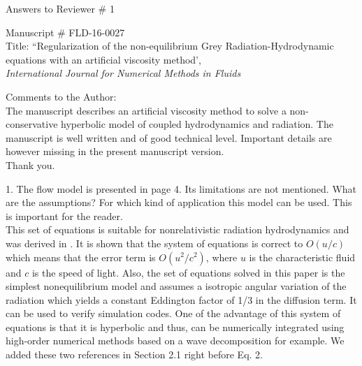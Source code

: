 \documentclass{article}
\begin{document}
\begin{center}
{ \Large Answers to Reviewer \# 1}
\end{center}

\bigskip

\noindent Manuscript \# FLD-16-0027 \\
Title: ``Regularization of the non-equilibrium Grey Radiation-Hydrodynamic equations with an artificial viscosity method', \\
{\it International Journal for Numerical Methods in Fluids}\\

\bigskip
\bigskip

{\color{blue}
Comments to the Author: \\ 
The manuscript describes an artificial viscosity method to solve a non-conservative hyperbolic model of coupled hydrodynamics and radiation. The manuscript is well written and of good technical level.
Important details are however missing in the present manuscript version.\\}
Thank you.
\bigskip

{\color{blue}
1. The flow model is presented in page 4. Its limitations are not mentioned. What are the assumptions? For which kind of application this model can be used. This is important for the reader. \\}
This set of equations is suitable for nonrelativistic radiation hydrodynamics and was derived in \cite{LowrieMorelHittinger, LowrieMorel}. It is shown that the system of equations is correct to $O(u/c)$ which means that the error term is $O(u^2/c^2)$, where $u$ is the characteristic fluid and $c$ is the speed of light. Also, the set of equations solved in this paper is the simplest nonequilibrium model and assumes a isotropic angular variation of the radiation which yields a constant Eddington factor of 1/3 in the diffusion term. It can be used to verify simulation codes. One of the advantage of this system of equations is that it is hyperbolic and thus,  can be numerically integrated using high-order numerical methods based on a wave decomposition for example. We added these two references in Section 2.1 right before Eq. 2. 
\bigskip
\end{document}

